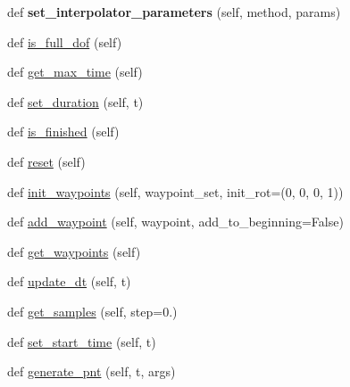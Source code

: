 \begin{DoxyCompactItemize}
def {\bfseries set\+\_\+interpolator\+\_\+parameters} (self, method, params)
\item 
def \hyperlink{classuuv__trajectory__generator_1_1wp__trajectory__generator_1_1WPTrajectoryGenerator_a188ac3db61ec1d7fddce639f6d9789f5}{is\+\_\+full\+\_\+dof} (self)
\item 
def \hyperlink{classuuv__trajectory__generator_1_1wp__trajectory__generator_1_1WPTrajectoryGenerator_af508c05f2d08ea360edefa811c364313}{get\+\_\+max\+\_\+time} (self)
\item 
def \hyperlink{classuuv__trajectory__generator_1_1wp__trajectory__generator_1_1WPTrajectoryGenerator_a1fd70c3f4d411817c9b5826e8694bfe1}{set\+\_\+duration} (self, t)
\item 
def \hyperlink{classuuv__trajectory__generator_1_1wp__trajectory__generator_1_1WPTrajectoryGenerator_ae24f85d1b7ff7423f401306d9e5c4fa8}{is\+\_\+finished} (self)
\item 
def \hyperlink{classuuv__trajectory__generator_1_1wp__trajectory__generator_1_1WPTrajectoryGenerator_a5b2a7e36542d6c770abcd2fb1f67b0b9}{reset} (self)
\item 
def \hyperlink{classuuv__trajectory__generator_1_1wp__trajectory__generator_1_1WPTrajectoryGenerator_a90271f97748286475362bb9ea66aa0f1}{init\+\_\+waypoints} (self, waypoint\+\_\+set, init\+\_\+rot=(0, 0, 0, 1))
\item 
def \hyperlink{classuuv__trajectory__generator_1_1wp__trajectory__generator_1_1WPTrajectoryGenerator_a82927f85ed2ef82ae6bc5bb43baddd85}{add\+\_\+waypoint} (self, waypoint, add\+\_\+to\+\_\+beginning=False)
\item 
def \hyperlink{classuuv__trajectory__generator_1_1wp__trajectory__generator_1_1WPTrajectoryGenerator_a11d14d2d95f8630c3ef0134e38706ba5}{get\+\_\+waypoints} (self)
\item 
def \hyperlink{classuuv__trajectory__generator_1_1wp__trajectory__generator_1_1WPTrajectoryGenerator_ad3272c72b79272c9efc76d51e3a65ab6}{update\+\_\+dt} (self, t)
\item 
def \hyperlink{classuuv__trajectory__generator_1_1wp__trajectory__generator_1_1WPTrajectoryGenerator_ae0ce59c4452e14e220c80fb322f70f58}{get\+\_\+samples} (self, step=0.)
\item 
def \hyperlink{classuuv__trajectory__generator_1_1wp__trajectory__generator_1_1WPTrajectoryGenerator_ab929f88ac25b6d2523ee4c967d32f994}{set\+\_\+start\+\_\+time} (self, t)
\item 
def \hyperlink{classuuv__trajectory__generator_1_1wp__trajectory__generator_1_1WPTrajectoryGenerator_a8d9d4853aca8a3408ea7780c18d6e46d}{generate\+\_\+pnt} (self, t, args)

\end{DoxyCompactItemize}
